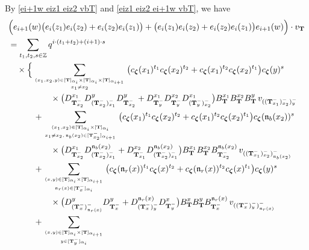 \documentclass[12pt]{amsart}
\numberwithin{equation}{thm}
\newcommand\ZZ{\mathbb Z}
\newcommand\bT{\mathbf T}
\newcommand\fn{\mathfrak n}
\renewcommand\a{\alpha}  %
\newcommand\Bz{\boldsymbol\zeta}
\begin{document}
By \eqref{ei+1w eiz1 eiz2 vbT} and \eqref{eiz1 eiz2 ei+1w vbT}, 
we have 
\begin{align}
\label{w z1 z2 z2 z1 z1 z2 z2 z1 w}
&\Big( e_{i+1} (w) \big( e_i (z_1) e_i(z_2) + e_i(z_2) e_i(z_1) \big) 
 	+ \big( e_i(z_1) e_i(z_2) + e_i(z_2) e_i (z_1) \big) e_{i+1} (w) \Big) \cdot v_{\bT} 
\\
&\notag
= \sum_{t_1,t_2, s \in \ZZ} q^{i \cdot (t_1 + t_2) + (i+1) \cdot s} 
	\\ \notag & \quad \times \Big\{  
	\sum_{(x_1,x_2,y) \in [\bT]_{\a_i} \times [\bT]_{\a_i} \times [\bT]_{\a_{i+1}} \atop x_1 \not= x_2} 
		\big( c_{\Bz}(x_1)^{t_1} c_{\Bz} (x_2)^{t_2} + c_{\Bz} (x_1)^{t_2} c_{\Bz} (x_2)^{t_1} \big) c_{\Bz} (y)^s 
		\\ \notag & \hspace{5em} \times 
		\big( D_{\bT_{x_2}^-}^{x_1} D_{(\bT_{x_2}^-)_{x_1}^-}^y D_{\bT_{x_2}^-}^y 
			+ D_{\bT_y^-}^{x_1} D_{\bT_y^-}^{x_2} D_{(\bT_y^-)_{x_2}^-}^{x_1} \big)  
		B_{\bT}^{x_1} B_{\bT}^{x_2} B_{\bT}^y 
		\, v_{((\bT_{x_1}^-)_{x_2}^-)_y^-} 
	\\ \notag & \hspace{3em} 
	+ \sum_{(x_1,x_2) \in [\bT]_{\a_i} \times [\bT]_{\a_i} \atop x_1 \not= x_2, \, \fn_b(x_2) \in [\bT_{x_2}^-]_{\a_{i+1}}} 
		\big( c_{\Bz}(x_1)^{t_1} c_{\Bz} (x_2)^{t_2} + c_{\Bz} (x_1)^{t_2} c_{\Bz} (x_2)^{t_1} \big) c_{\Bz} (\fn_b (x_2))^s 
		\\ \notag & \hspace{5em} \times 
		\big( D_{\bT_{x_2}^-}^{x_1} D_{(\bT_{x_2}^-)_{x_1}^-}^{\fn_b (x_2)} 
			+ D_{\bT_{x_1}^-}^{x_2} D_{(\bT_{x_2}^-)_{x_1}^-}^{\fn_b (x_2)} \big) 
		B_{\bT}^{x_1} B_{\bT}^{x_2} B_{\bT_{x_2}^-}^{\fn_b(x_2)} 
		\, v_{((\bT_{x_1}^-)_{x_2}^-)_{\fn_b(x_2)}^-} 
	\\ \notag & \hspace{3em} 
	+ \sum_{(x,y) \in [\bT]_{\a_i} \times [\bT]_{\a_{i+1}} \atop \fn_r (x) \in [\bT_x^-]_{\a_i}} 
		\big( c_{\Bz} (\fn_r (x))^{t_1} c_{\Bz} (x)^{t_2} + c_{\Bz} (\fn_r(x))^{t_2} c_{\Bz} (x)^{t_1} \big) c_{\Bz} (y)^s 
		\\ \notag & \hspace{5em} \times 
		\big( D_{(\bT_x^-)_{\fn_r(x)}^-}^y D_{\bT_x^-}^y + D_{(\bT_x^-)_y^-}^{\fn_r(x)} D_{\bT_y^-}^x \big) 
		B_{\bT}^x B_{\bT}^y B_{\bT_x^-}^{\fn_r(x)} 
		\, v_{((\bT_x^-)_y^-)_{\fn_r(x)}^-} 
	\\ \notag & \hspace{3em} 
	+ \sum_{(x,y) \in [\bT]_{\a_i} \times [\bT]_{\a_{i+1}} \atop y \in [\bT_y^-]_{\a_i}} 

\end{align}
\end{document}
